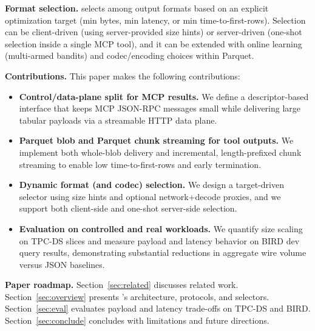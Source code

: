 \smallskip
\noindent\textbf{Format selection.}
\system selects among output formats based on an explicit optimization target (min bytes, min latency, or min time-to-first-rows). Selection can be client-driven (using server-provided size hints) or server-driven (one-shot selection inside a single MCP tool), and it can be extended with online learning (multi-armed bandits) and codec/encoding choices within Parquet.

\smallskip
\noindent\textbf{Contributions.}
This paper makes the following contributions:
\begin{itemize}
    \item \textbf{Control/data-plane split for MCP results.} We define a descriptor-based interface that keeps MCP JSON-RPC messages small while delivering large tabular payloads via a streamable HTTP data plane.
    \item \textbf{Parquet blob and Parquet chunk streaming for tool outputs.} We implement both whole-blob delivery and incremental, length-prefixed chunk streaming to enable low time-to-first-rows and early termination.
    \item \textbf{Dynamic format (and codec) selection.} We design a target-driven selector using size hints and optional network+decode proxies, and we support both client-side and one-shot server-side selection.
    \item \textbf{Evaluation on controlled and real workloads.} We quantify size scaling on TPC-DS slices and measure payload and latency behavior on BIRD dev query results, demonstrating substantial reductions in aggregate wire volume versus JSON baselines.
\end{itemize}

\smallskip
\noindent\textbf{Paper roadmap.}
Section~\ref{sec:related} discusses related work. Section~\ref{sec:overview} presents \system’s architecture, protocols, and selectors. Section~\ref{sec:eval} evaluates payload and latency trade-offs on TPC-DS and BIRD. Section~\ref{sec:conclude} concludes with limitations and future directions.